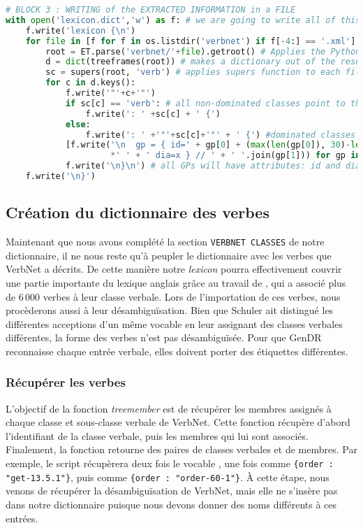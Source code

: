 \begin{lstlisting}[language=Python, caption = Importation de l'architecture des classes verbales, label=fig:archivn]
# BLOCK 3 : WRITING of the EXTRACTED INFORMATION in a FILE
with open('lexicon.dict','w') as f: # we are going to write all of this block into lexicon.dict
    f.write('lexicon {\n')
    for file in [f for f in os.listdir('verbnet') if f[-4:] == '.xml']: # open VerbNet XMl files
        root = ET.parse('verbnet/'+file).getroot() # Applies the Python Element Tree module
        d = dict(treeframes(root)) # makes a dictionary out of the results of treeframes on a file
        sc = supers(root, 'verb') # applies supers function to each file
        for c in d.keys():
            f.write('"'+c+'"')
            if sc[c] == 'verb': # all non-dominated classes point to the default verb class
                f.write(': ' +sc[c] + ' {') 
            else:
                f.write(': ' +'"'+sc[c]+'"' + ' {') #dominated classes point towards their governor
            [f.write('\n  gp = { id=' + gp[0] + (max(len(gp[0]), 30)-len(gp[0]))
                     *' ' + ' dia=x } // ' + ' '.join(gp[1])) for gp in d[c]]
            f.write('\n}\n') # all GPs will have attributes: id and dia
    f.write('\n}')
\end{lstlisting}

\subsection{Création du dictionnaire des verbes} \label{extracmembre}

Maintenant que nous avons complété la section \texttt{VERBNET CLASSES} de notre dictionnaire, il ne nous reste qu'à peupler le dictionnaire avec les verbes que VerbNet a décrits. De cette manière notre \emph{lexicon} pourra effectivement couvrir une partie importante du lexique anglais grâce au travail de \cite{SchulerVerbnetBroadcoverageComprehensive2005}, qui a associé plus de 6\,000 verbes à leur classe verbale. Lors de l'importation de ces verbes, nous procèderons aussi à leur désambiguïsation. Bien que Schuler ait distingué les différentes acceptions d'un même vocable en leur assignant des classes verbales différentes, la forme des verbes n'est pas désambiguïsée. Pour que GenDR reconnaisse chaque entrée verbale, elles doivent porter des étiquettes différentes.

\subsubsection{Récupérer les verbes}
L'objectif de la fonction \emph{treemember} est de récupérer les membres assignés à chaque classe et sous-classe verbale de VerbNet. Cette fonction récupère d'abord l'identifiant de la classe verbale, puis les membres qui lui sont associés. Finalement, la fonction retourne des paires de classes verbales et de membres. Par exemple, le script récupèrera deux fois le vocable , une fois comme \lstinline|{order : "get-13.5.1"}|, puis comme \lstinline|{order : "order-60-1"}|. À cette étape, nous venons de récupérer la désambiguïsation de VerbNet, mais elle ne s'insère pas dans notre dictionnaire puisque nous devons donner des noms différents à ces entrées.

